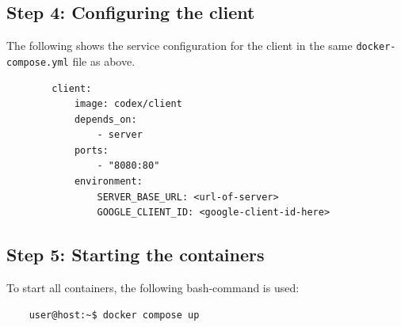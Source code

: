 \subsection{Step 4: Configuring the client}

The following shows the service configuration for the client in the same \texttt{docker-compose.yml} file as above.

\begin{verbatim}
        client:
            image: codex/client
            depends_on:
                - server
            ports:
                - "8080:80"
            environment:
                SERVER_BASE_URL: <url-of-server>
                GOOGLE_CLIENT_ID: <google-client-id-here>
\end{verbatim}

\subsection{Step 5: Starting the containers}

To start all containers, the following bash-command is used: 

\begin{verbatim}
    user@host:~$ docker compose up
\end{verbatim}